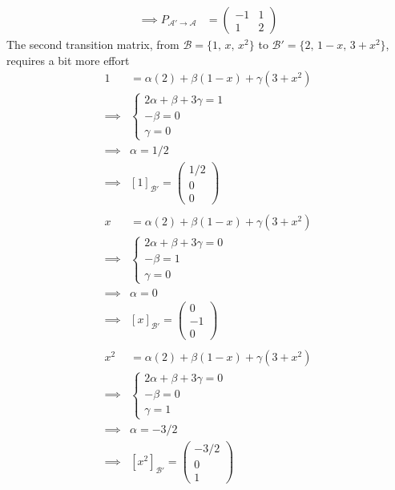 {\begin{align*}
\implies P_{\mathcal{A}'\to\mathcal{A}}
&=
\begin{pmatrix} 
 -1 & 1\\ 
  1 & 2
\end{pmatrix}
\end{align*}
The second transition matrix, from $\mathcal{B}=\{1,\,x,\,x^2\}$ to $\mathcal{B}'=\{2,\,1-x,\,3+x^2\}$, requires a bit more effort
\begin{align*}
1 &= \alpha(2) + \beta(1-x) + \gamma(3+x^2) \\
\implies &
\begin{cases}
2\alpha + \beta + 3\gamma = 1 \\
-\beta = 0 \\
\gamma = 0
\end{cases} \\
\implies & \alpha = 1/2 \\
\implies & [1]_{\mathcal{B}'} = \begin{pmatrix} 1/2 \\ 0 \\ 0 \end{pmatrix} \\ \\
x &= \alpha(2) + \beta(1-x) + \gamma(3+x^2) \\
\implies &
\begin{cases}
2\alpha + \beta + 3\gamma = 0 \\
-\beta = 1 \\
\gamma = 0
\end{cases} \\
\implies & \alpha = 0 \\
\implies & [x]_{\mathcal{B}'} = \begin{pmatrix} 0 \\ -1 \\ 0 \end{pmatrix} \\ \\
x^2 &= \alpha(2) + \beta(1-x) + \gamma(3+x^2) \\
\implies &
\begin{cases}
2\alpha + \beta + 3\gamma = 0 \\
-\beta = 0 \\
\gamma = 1
\end{cases} \\
\implies & \alpha = -3/2 \\
\implies & [x^2]_{\mathcal{B}'} = \begin{pmatrix} -3/2 \\ 0 \\ 1 \end{pmatrix}

\end{align*}}

